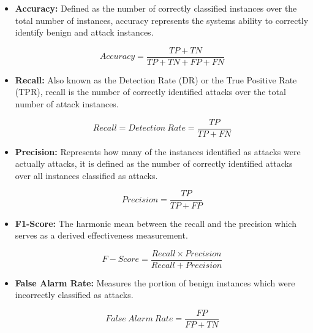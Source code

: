\documentclass[conference]{IEEEtran}
\begin{document}
\begin{itemize}
    \item \textbf{Accuracy:} Defined as the number of correctly classified instances over the total number of instances, accuracy represents the systems ability to correctly identify benign and attack instances. 
    
    \begin{equation}\label{eq1}
        Accuracy= \frac{TP + TN}{TP + TN + FP + FN}
    \end{equation}
    
    \item \textbf{Recall:} Also known as the Detection Rate (DR) or the True Positive Rate (TPR), recall is the number of correctly identified attacks over the total number of attack instances.
    
    \begin{equation}\label{eq2}
        Recall = Detection\:Rate = \frac{TP}{TP + FN}
    \end{equation}
    
    \item \textbf{Precision:} Represents how many of the instances identified as attacks were actually attacks, it is defined as the number of correctly identified attacks over all instances classified as attacks.
    
    \begin{equation}\label{eq3}
        Precision =  \frac{TP}{TP + FP}
    \end{equation}
    
    \item \textbf{F1-Score:} The harmonic mean between the recall and the precision which serves as a derived effectiveness measurement. 
    
    \begin{equation}\label{eq3}
        F-Score =  \frac{Recall \times Precision}{Recall + Precision}
    \end{equation}
    
    \item \textbf{False Alarm Rate:} Measures the portion of benign instances which were incorrectly classified as attacks.
    
    \begin{equation}\label{eq3}
        False\:Alarm\:Rate =  \frac{FP}{FP+TN}
    \end{equation}
    
\end{itemize}
\end{document}
